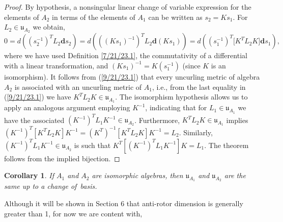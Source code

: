 \documentclass{amsart}
\newtheorem{corollary}[theorem]{Corollary}
\theoremstyle{definition}
\numberwithin{theorem}{section}
\numberwithin{equation}{section}
\begin{document}
\begin{proof} By hypothesis, a nonsingular linear change of variable expression for the elements of $A_2$ in terms of the elements of $A_1$ can be written as $s_2= Ks_1$. \mbox{For $L_2\in \mathfrak{u}_{A_2}$} we obtain, \begin{equation} 0 = d\left((s_2^{-1})^T L_2 \mathbf{d}s_2\right) =  d\left(((Ks_1)^{-1})^T L_2 \mathbf{d}(Ks_1)\right) = d\left((s_1^{-1})^T \big[K^T L_2K\big]\mathbf{d}s_1\right), \label{9/21/23.1}  \end{equation} where we have used Definition \ref{7/21/23.1}, the commutativity of a differential with a linear transformation, and $(Ks_1)^{-1} = K(s_1^{-1})$ (since $K$ is an isomorphism).   It follows from (\ref{9/21/23.1}) that every uncurling metric  of algebra $A_2$ is associated with an uncurling metric of $A_1$, i.e., from the last equality in (\ref{9/21/23.1}) we have  $K^TL_2K\in\mathfrak{u}_{A_1}$.  The isomorphism hypothesis allows us to apply an analogous argument employing $K^{-1}$, indicating that for $L_1\in\mathfrak{u}_{A_1}$ we have the associated $(K^{-1})^T L_1 K^{-1} \in \mathfrak{u}_{A_2}$.    Furthermore, $K^T L_2K\in\mathfrak{u}_{A_1}$ implies $(K^{-1})^T [K^T L_2 K]K^{-1} = (K^T)^{-1} [K^T L_2 K]K^{-1} = L_2$.  Similarly, $(K^{-1})^T L_1K^{-1}\in\mathfrak{u}_{A_2}$ is such that $K^T[(K^{-1})^T L_1K^{-1}] K = L_1$.  The theorem follows from the implied bijection. 
\end{proof}

\begin{corollary}\label{7/31/25.1} If $A_1$ and $A_2$ are isomorphic algebras, then $\mathfrak{u}_{A_1}$ and $\mathfrak{u}_{A_2}$ are the same up to a change \mbox{of basis}. \end{corollary}  

Although it will be shown in Section 6 that anti-rotor dimension is generally greater than 1, for now we are content with,       
\end{document}
